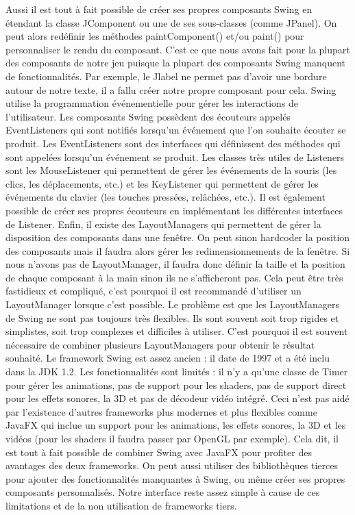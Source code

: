 \documentclass{article}
\begin{document}
    Aussi il est tout à fait possible de créer ses propres composants Swing en étendant la classe JComponent ou une de ses sous-classes (comme JPanel).
    On peut alors redéfinir les méthodes paintComponent() et/ou paint() pour personnaliser le rendu du composant.
    C'est ce que nous avons fait pour la plupart des composants de notre jeu puisque la plupart des composants Swing manquent de fonctionnalités.
    Par exemple, le Jlabel ne permet pas d'avoir une bordure autour de notre texte, il a fallu créer notre propre composant pour cela.
    \newline
    Swing utilise la programmation événementielle pour gérer les interactions de l'utilisateur.
    Les composants Swing possèdent des écouteurs appelés EventListeners qui sont notifiés lorsqu'un événement que l'on souhaite écouter se produit.
    Les EventListeners sont des interfaces qui définissent des méthodes qui sont appelées lorsqu'un événement se produit.
    Les classes très utiles de Listeners sont les MouseListener qui permettent de gérer les événements de la souris (les clics, les déplacements, etc.) et les KeyListener qui permettent de gérer les événements du clavier (les touches pressées, relâchées, etc.).
    Il est également possible de créer ses propres écouteurs en implémentant les différentes interfaces de Listener.
    \newline
    Enfin, il existe des LayoutManagers qui permettent de gérer la disposition des composants dans une fenêtre.
    On peut sinon hardcoder la position des composants mais il faudra alors gérer les redimensionnements de la fenêtre.
    Si nous n'avons pas de LayoutManager, il faudra donc définir la taille et la position de chaque composant à la main sinon ils ne s'afficheront pas.
    Cela peut être très fastidieux et compliqué, c'est pourquoi il est recommandé d'utiliser un LayoutManager lorsque c'est possible.
    Le problème est que les LayoutManagers de Swing ne sont pas toujours très flexibles.
    Ils sont souvent soit trop rigides et simplistes, soit trop complexes et difficiles à utiliser.
    C'est pourquoi il est souvent nécessaire de combiner plusieurs LayoutManagers pour obtenir le résultat souhaité.
    \newline
    Le framework Swing est assez ancien : il date de 1997 et a été inclu dans la JDK 1.2.
    Les fonctionnalités sont limités : il n'y a qu'une classe de Timer pour gérer les animations, pas de support pour les shaders, pas de support direct pour les effets sonores, la 3D et pas de décodeur vidéo intégré.
    Ceci n'est pas aidé par l'existence d'autres frameworks plus modernes et plus flexibles comme JavaFX qui inclue un support pour les animations, les effets sonores, la 3D et les vidéos (pour les shaders il faudra passer par OpenGL par exemple).
    Cela dit, il est tout à fait possible de combiner Swing avec JavaFX pour profiter des avantages des deux frameworks.
    On peut aussi utiliser des bibliothèques tierces pour ajouter des fonctionnalités manquantes à Swing, ou même créer ses propres composants personnalisés.
    Notre interface reste assez simple à cause de ces limitations et de la non utilisation de frameworks tiers.    
    
\end{document}
